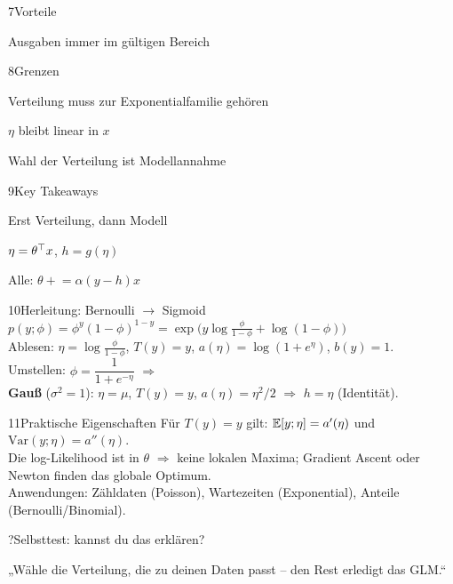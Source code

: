 \begin{hngrid}
\begin{hnp}[raster multicolumn=2,acc=hngreen]{7}{Vorteile}
\begin{hnpro}
\item Ausgaben immer im gültigen Bereich
\end{hnpro}
\end{hnp}
%
\begin{hnp}[raster multicolumn=2,acc=hnred]{8}{Grenzen}
\begin{hncon}
\item Verteilung muss zur Exponentialfamilie gehören
\item $\eta$ bleibt linear in $x$
\item Wahl der Verteilung ist Modellannahme
\end{hncon}
\end{hnp}
%
\begin{hnp}[raster multicolumn=2,acc=hnorange]{9}{Key Takeaways}
\begin{hnchk}
\item Erst Verteilung, dann Modell
\item $\eta=\theta^{\top} x$, $h=g(\eta)$
\item Alle: $\theta\mathrel{+}=\alpha(y-h)x$
\end{hnchk}
\end{hnp}
%
\begin{hnp}[raster multicolumn=3,acc=hnteal]{10}{Herleitung: Bernoulli $\to$ Sigmoid}
$p(y;\phi)=\phi^y(1-\phi)^{1-y}=\exp\bigl(y\log\tfrac{\phi}{1-\phi}+\log(1-\phi)\bigr)$\\
Ablesen: $\eta=\log\frac{\phi}{1-\phi}$, $T(y)=y$, $a(\eta)=\log(1+e^{\eta})$, $b(y)=1$.\\
Umstellen: $\phi=\dfrac{1}{1+e^{-\eta}}$ \; $\Rightarrow$ \\
\textbf{Gauß} ($\sigma^2{=}1$): $\eta=\mu$, $T(y)=y$, $a(\eta)=\eta^2/2$ $\Rightarrow$ $h=\eta$ (Identität).
\end{hnp}
%
\begin{hnp}[raster multicolumn=3,acc=hnpurple]{11}{Praktische Eigenschaften}
Für $T(y)=y$ gilt: $\mathbb{E}[y;\eta]=a'(\eta)$ und $\mathrm{Var}(y;\eta)=a''(\eta)$.\\
Die log-Likelihood ist in $\theta$  $\Rightarrow$ keine lokalen Maxima; Gradient Ascent oder Newton finden das globale Optimum.\\
Anwendungen: Zähldaten (Poisson), Wartezeiten (Exponential), Anteile (Bernoulli/Binomial).
\end{hnp}
%
\begin{hnp}[raster multicolumn=6,acc=hnpurple,colback=hnlilac!30]{?}{Selbsttest: kannst du das erklären?}
\end{hnp}
%
\begin{hnbanner}[raster multicolumn=6]
„Wähle die Verteilung, die zu deinen Daten passt -- den Rest erledigt das GLM.“
\end{hnbanner}
\end{hngrid}
